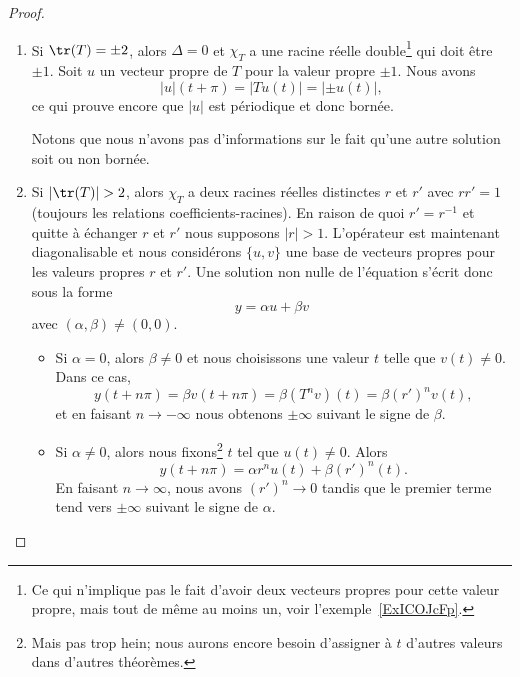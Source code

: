 \begin{proof}
\begin{enumerate}
		\item

		      Si \( \tr(T)=\pm 2\), alors \( \Delta=0\) et \( \chi_T\) a une racine réelle double\footnote{Ce qui n'implique pas le fait d'avoir deux vecteurs propres pour cette valeur propre, mais tout de même au moins un, voir l'exemple~\ref{ExICOJcFp}.} qui doit être \( \pm 1\). Soit \( u\) un vecteur propre de \( T\) pour la valeur propre \( \pm 1\). Nous avons
		      \begin{equation}
			      | u |(t+\pi)=| Tu(t) |=| \pm u(t) |,
		      \end{equation}
		      ce qui prouve encore que \( | u |\) est périodique et donc bornée.

		      Notons que nous n'avons pas d'informations sur le fait qu'une autre solution soit ou non bornée.

		\item

		      Si \( | \tr(T) |>2\), alors \( \chi_T\) a deux racines réelles distinctes \( r\) et \( r'\) avec \( rr'=1\) (toujours les relations coefficients-racines). En raison de quoi \( r'=r^{-1}\) et quitte à échanger \( r\) et \( r'\) nous supposons \( | r |>1\). L'opérateur est maintenant diagonalisable et nous considérons \( \{ u,v \}\) une base de vecteurs propres pour les valeurs propres \( r\) et \( r'\). Une solution non nulle de l'équation s'écrit donc sous la forme
		      \begin{equation}
			      y=\alpha u+\beta v
		      \end{equation}
		      avec \( (\alpha,\beta)\neq (0,0)\).

		      \begin{itemize}
			      \item Si \( \alpha=0\), alors \( \beta\neq 0\) et nous choisissons une valeur \( t\) telle que \( v(t)\neq 0\). Dans ce cas,
			            \begin{equation}
				            y(t+n\pi)=\beta v(t+n\pi)=\beta(T^nv)(t)=\beta (r')^n v(t),
			            \end{equation}
			            et en faisant \( n\to -\infty\) nous obtenons \( \pm \infty\) suivant le signe de \( \beta\).

			      \item Si \( \alpha\neq 0\), alors nous fixons\footnote{Mais pas trop hein; nous aurons encore besoin d'assigner à \( t\) d'autres valeurs dans d'autres théorèmes.} \( t\) tel que \( u(t)\neq 0\). Alors
			            \begin{equation}
				            y(t+n\pi)=\alpha r^nu(t)+\beta (r')^n(t).
			            \end{equation}
			            En faisant \( n\to \infty\), nous avons \( (r')^n\to 0\) tandis que le premier terme tend vers \( \pm\infty\) suivant le signe de \( \alpha\).
		      \end{itemize}


\end{enumerate}
\end{proof}
